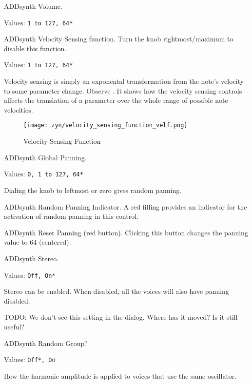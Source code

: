    \setcounter{ItemCounter}{0}      %

   ADDsynth Volume.

   Values: \texttt{1 to 127, 64*}

   ADDsynth Velocity Sensing function.
   Turn the knob rightmost/maximum to disable this function.

   Values: \texttt{1 to 127, 64*}

   Velocity sensing is simply an exponental transformation from the note’s
   velocity to some parameter change.
   Observe .
   It shows how the velocity sensing controls affects the translation of a
   parameter over the whole range of possible note velocities.

\begin{figure}[H]
   \centering 
   \texttt{[image: zyn/velocity\_sensing\_function\_velf.png]}
   \caption{Velocity Sensing Function}
   \label{fig:velocity_sensing_function}
\end{figure}

   ADDsynth Global Panning.

   Values: \texttt{0, 1 to 127, 64*}

   Dialing the knob to leftmost or zero gives random panning.

   ADDsynth Random Panning Indicator.
   A red filling provides an indicator for the activation of random panning
   in this control.

   ADDsynth Reset Panning (red button).
   Clicking this button changes the panning value to 64 (centered).

   ADDsynth Stereo.

   Values: \texttt{Off, On*}

   Stereo can be enabled.
   When disabled, all the voices will also have panning disabled.

   TODO:  We don't see this setting in the dialog.  Where has it moved? Is
   it still useful?

   ADDsynth Random Group?

   Values: \texttt{Off*, On}

   How the harmonic amplitude is applied to voices that use the same
   oscillator.

